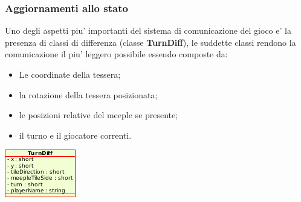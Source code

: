 \subsubsection{Aggiornamenti allo stato}
	Uno degli aspetti piu' importanti del sistema di comunicazione del gioco
	e' la presenza di classi di differenza (classe \textbf{TurnDiff}), le
	suddette classi rendono la comunicazione il piu' leggero possibile
	essendo composte da:\\

\begin{minipage}{.60\textwidth}
	\begin{itemize}
		\item Le coordinate della tessera;
		\item la rotazione della tessera posizionata;
		\item le posizioni relative del meeple se presente;
		\item il turno e il giocatore correnti.
	\end{itemize}
\end{minipage}
\begin{minipage}{.20\textwidth}
	\includegraphics{img/turndiff.png}
\end{minipage}

